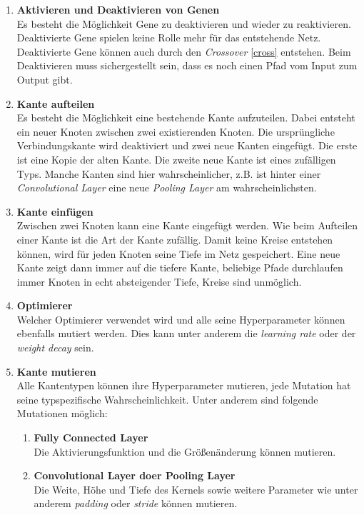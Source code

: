 \documentclass[]{scrartcl}
\begin{document}
			\begin{enumerate}
				\item [] \textbf{Aktivieren und Deaktivieren von Genen} \\
					Es besteht die Möglichkeit Gene zu deaktivieren und wieder zu reaktivieren. Deaktivierte Gene spielen keine Rolle mehr für das entstehende Netz.
					Deaktivierte Gene können auch durch den \textit{Crossover} \ref{cross} entstehen. Beim Deaktivieren muss sichergestellt sein, dass
					es noch einen Pfad vom Input zum Output gibt.

				\item [] \textbf{Kante aufteilen} \\
					Es besteht die Möglichkeit eine bestehende Kante aufzuteilen. Dabei entsteht ein neuer Knoten zwischen zwei existierenden Knoten.
					Die ursprüngliche Verbindungskante wird deaktiviert und zwei neue Kanten eingefügt. Die erste ist eine Kopie der alten Kante.
					Die zweite neue Kante ist eines zufälligen Typs. Manche Kanten sind hier wahrscheinlicher, z.B. ist hinter einer
					\textit{Convolutional Layer} eine neue \textit{Pooling Layer} am wahrscheinlichsten.

				\item [] \textbf{Kante einfügen} \\
					Zwischen zwei Knoten kann eine Kante eingefügt werden. Wie beim Aufteilen einer Kante ist die Art der Kante zufällig.
					Damit keine Kreise entstehen können, wird für jeden Knoten seine Tiefe im Netz gespeichert.
					Eine neue Kante zeigt dann immer auf die tiefere Kante, beliebige Pfade durchlaufen immer Knoten in echt absteigender Tiefe,
					Kreise sind unmöglich.

				\item [] \textbf{Optimierer} \\
					Welcher Optimierer verwendet wird und alle seine Hyperparameter können ebenfalls mutiert werden.
					Dies kann unter anderem die \textit{learning rate} oder der \textit{weight decay} sein.

				\item [] \textbf{Kante mutieren} \\
					Alle Kantentypen können ihre Hyperparameter mutieren, jede Mutation hat seine typspezifische Wahrscheinlichkeit.
					Unter anderem sind folgende Mutationen möglich:
					\begin{enumerate}
						\item [] \textbf{Fully Connected Layer} \\
							Die Aktivierungsfunktion und die Größenänderung können mutieren.
						\item [] \textbf{Convolutional Layer doer Pooling Layer} \\
							Die Weite, Höhe und Tiefe des Kernels sowie weitere Parameter wie unter anderem \textit{padding} oder \textit{stride} können mutieren.
					\end{enumerate}
			\end{enumerate}
\end{document}
